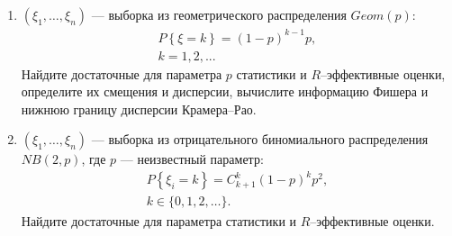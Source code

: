 \documentclass[a4paper,12pt]{article}
\newcommand{\probability}[1]{P \left\{ #1 \right\}}
\newcommand{\sample}[2]{\left( #1_1, \dots, #1_{#2} \right)}
\begin{document}
\begin{enumerate}[topsep=1cm, parsep=1cm, resume]
              \item $\sample{\xi}{n}$ --- выборка из геометрического распределения $Geom(p)$:
              \begin{gather*}
                  \probability{\xi = k} = (1-p)^{k-1} p , \\
                  k = 1, 2, ...
              \end{gather*}
              Найдите достаточные для параметра $p$ статистики и $R$--эффективные оценки, определите их смещения и дисперсии, вычислите информацию Фишера
              и нижнюю границу дисперсии Крамера--Рао.

        \item $\sample{\xi}{n}$ --- выборка из отрицательного биномиального распределения $NB(2,p)$, где $p$ --- неизвестный параметр:
              \begin{gather*}
                  \probability{\xi_i = k} = C_{k+1}^k (1-p)^k p^2 , \\
                  k \in \{0, 1, 2, \dots \} .
              \end{gather*}
              Найдите достаточные для параметра статистики и $R$--эффективные оценки.
    \end{enumerate}
\fi
\end{document}
